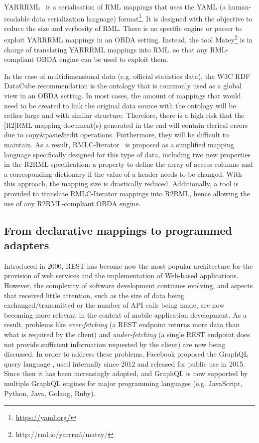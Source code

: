 YARRRML~\citep{Heyvaert2018Declarative} is a serialisation of RML mappings that uses the YAML (a human-readable data serialization language) format\footnote{\url{https://yaml.org/}}. It is designed with the objective to reduce the size and verbosity of RML. There is no specific engine or parser to exploit YARRRML mappings in an OBDA setting. Instead, the tool Matey\footnote{http://rml.io/yarrrml/matey/} is in charge of translating YARRRML mappings into RML, so that any RML-compliant OBDA engine can be used to exploit them.

In the case of multidimensional data (e.g. official statistics data), the W3C RDF DataCube recommendation is the ontology that is commonly used as a global view in an OBDA setting. In most cases, the amount of mappings that would need to be created to link the original data source with the ontology will be rather large and with similar structure. Therefore, there is a high risk that the [R2]RML mapping document(s) generated in the end will contain clerical errors due to copy\&paste\&edit operations. Furthermore, they will be difficult to maintain. As a result, RMLC-Iterator~\citep{chaves2018virtual} is proposed as a simplified mapping language specifically designed for this type of data, including two new properties in the R2RML specification: a property to define the array of access columns and a corresponding dictionary if the value of a header needs to be changed. With this approach, the mapping size is drastically reduced. Additionally, a tool is provided to translate RMLC-Iterator mappings into R2RML, hence allowing the use of any R2RML-compliant OBDA engine.



\subsection{From declarative mappings to programmed adapters}
Introduced in 2000, REST \citep{fielding2000architectural} has become now the most popular architecture for the provision of web services and the implementation of Web-based applications. However, the complexity of software development continues evolving, and aspects that received little attention, such as the size of data being exchanged/transmitted or the number of API calls being made, are now becoming more relevant in the context of mobile application development. As a result, problems like \textit{over-fetching} (a REST endpoint returns more data than what is required by the client) and \textit{under-fetching} (a single REST endpoint does not provide sufficient information requested by the client) are now being discussed. In order to address these problems, Facebook proposed the GraphQL query language \citep{graphql}, used internally since 2012 and released for public use in 2015. Since then it has been increasingly adopted, and GraphQL is now supported by multiple GraphQL engines for major programming languages (e.g. JavaScript, Python, Java, Golang, Ruby).


